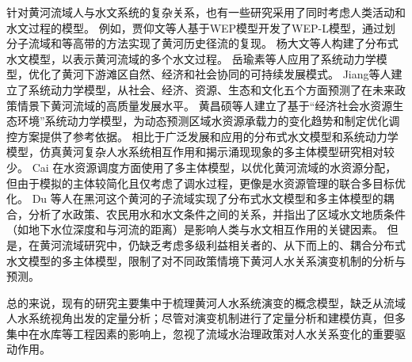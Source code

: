 针对黄河流域人与水文系统的复杂关系，也有一些研究采用了同时考虑人类活动和水文过程的模型。
例如，贾仰文等人基于WEP模型开发了WEP-L模型，通过划分子流域和等高带的方法实现了黄河历史径流的复现\cite{jiayangwen2005}。
杨大文等人构建了分布式水文模型，以表示黄河流域的多个水文过程\cite{yangdawen2004}。
岳瑜素等人应用了系统动力学模型，优化了黄河下游滩区自然、经济和社会协同的可持续发展模式\cite{yueyusu2020}。
Jiang等人建立了系统动力学模型，从社会、经济、资源、生态和文化五个方面预测了在未来政策情景下黄河流域的高质量发展水平\cite{jiang2021b}。
黄昌硕等人建立了基于“经济社会\textendash{}水资源\textendash{}生态环境”系统动力学模型，为动态预测区域水资源承载力的变化趋势和制定优化调控方案提供了参考依据\cite{huangchangshuo2021}。
相比于广泛发展和应用的分布式水文模型和系统动力学模型，仿真黄河复杂人\textendash{}水系统相互作用和揭示涌现现象的多主体模型研究相对较少。
Cai 在水资源调度方面使用了多主体模型，以优化黄河流域的水资源分配，但由于模拟的主体较简化且仅考虑了调水过程，更像是水资源管理的联合多目标优化\cite{cai2011}。
Du 等人在黑河这个黄河的子流域实现了分布式水文模型和多主体模型的耦合，分析了水政策、农民用水和水文条件之间的关系，并指出了区域水文地质条件（如地下水位深度和与河流的距离）是影响人类与水文相互作用的关键因素\cite{du2020}。
但是，在黄河流域研究中，仍缺乏考虑多级利益相关者的、从下而上的、耦合分布式水文模型的多主体模型，限制了对不同政策情境下黄河人\textendash{}水关系演变机制的分析与预测。

总的来说，现有的研究主要集中于梳理黄河人\textendash{}水系统演变的概念模型，缺乏从流域人\textendash{}水系统视角出发的定量分析；尽管对演变机制进行了定量分析和建模仿真，但多集中在水库等工程因素的影响上，忽视了流域水治理政策对人\textendash{}水关系变化的重要驱动作用。
